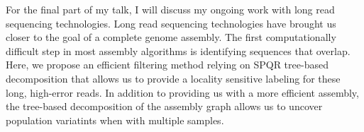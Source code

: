 For the final part of my talk, I will discuss my ongoing work with long read sequencing technologies. Long read sequencing technologies have brought us closer to the goal of a complete genome assembly.  The first computationally difficult step in most assembly algorithms is identifying sequences that overlap.  Here, we propose an efficient filtering method relying on SPQR tree-based decomposition that allows us to provide a locality sensitive labeling for these long, high-error reads.  In addition to providing us with a more efficient assembly, the tree-based decomposition of the assembly graph allows us to uncover population variatints when with multiple samples.